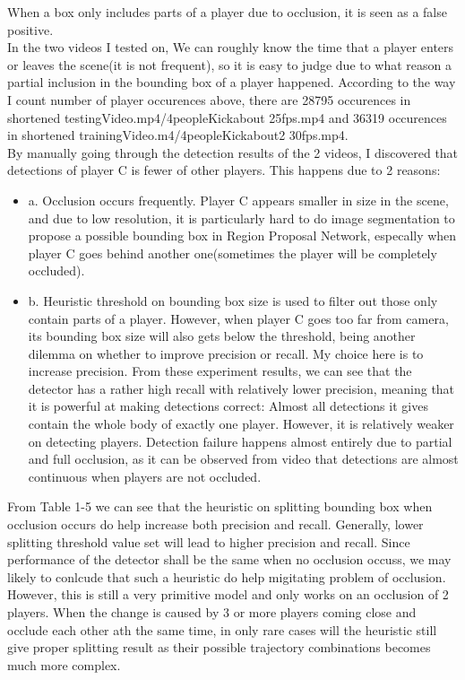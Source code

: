 \documentclass{article}
\begin{document}
When a box only includes parts of a player due to occlusion, it is seen as a false positive.\\
In the two videos I tested on, We can roughly know the time that a player enters or leaves the scene(it is not frequent), so it is easy to judge due to what reason a partial inclusion in the bounding box of a player happened.
According to the way I count number of player occurences above, there are 28795 occurences in shortened testingVideo.mp4/4peopleKickabout 25fps.mp4 and 36319 occurences in shortened trainingVideo.m4/4peopleKickabout2 30fps.mp4.\\
By manually going through the detection results of the 2 videos, I discovered that detections of player C is fewer of other players. This happens due to 2 reasons:
\begin{itemize}
\item a. Occlusion occurs frequently. Player C appears smaller in size in the scene, and due to low resolution, it is particularly hard to do image segmentation to propose a possible bounding box in Region Proposal Network, especally when player C goes behind another one(sometimes the player will be completely occluded).
\item b. Heuristic threshold on bounding box size is used to filter out those only contain parts of a player. However, when player C goes too far from camera, its bounding box size will also gets below the threshold, being another dilemma on whether to improve precision or recall. My choice here is to increase precision.
From these experiment results, we can see that the detector has a rather high recall with relatively lower precision, meaning that it is powerful at making detections correct: Almost all detections it gives contain the whole body of exactly one player. However, it is relatively weaker on detecting players. Detection failure happens almost entirely due to partial and full occlusion, as it can be observed from video that detections are almost continuous when players are not occluded.
\end{itemize}
From Table 1-5 we can see that the heuristic on splitting bounding box when occlusion occurs do help increase both precision and recall. Generally, lower splitting threshold value set will lead to higher precision and recall. Since performance of the detector shall be the same when no occlusion occuss, we may likely to conlcude that such a heuristic do help migitating problem of occlusion.\\
However, this is still a very primitive model and only works on an occlusion of 2 players. When the change is caused by 3 or more players coming close and occlude each other ath the same time, in only rare cases will the heuristic still give proper splitting result as their possible trajectory combinations becomes much more complex.\\
\end{document}
